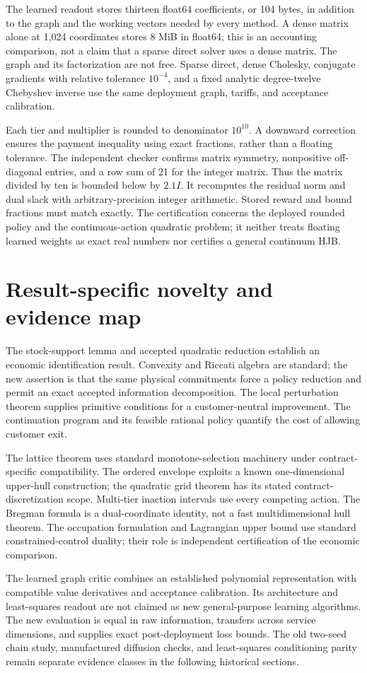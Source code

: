 The learned readout stores thirteen float64 coefficients, or 104 bytes, in addition to the graph and the working vectors needed by every method. A dense matrix alone at 1,024 coordinates stores 8 MiB in float64; this is an accounting comparison, not a claim that a sparse direct solver uses a dense matrix. The graph and its factorization are not free. Sparse direct, dense Cholesky, conjugate gradients with relative tolerance $10^{-4}$, and a fixed analytic degree-twelve Chebyshev inverse use the same deployment graph, tariffs, and acceptance calibration.

Each tier and multiplier is rounded to denominator $10^{10}$. A downward correction ensures the payment inequality using exact fractions, rather than a floating tolerance. The independent checker confirms matrix symmetry, nonpositive off-diagonal entries, and a row sum of 21 for the integer matrix. Thus the matrix divided by ten is bounded below by $2.1I$. It recomputes the residual norm and dual slack with arbitrary-precision integer arithmetic. Stored reward and bound fractions must match exactly. The certification concerns the deployed rounded policy and the continuous-action quadratic problem; it neither treats floating learned weights as exact real numbers nor certifies a general continuum HJB.

\section{Result-specific novelty and evidence map}
The stock-support lemma and accepted quadratic reduction establish an economic identification result. Convexity and Riccati algebra are standard; the new assertion is that the same physical commitments force a policy reduction and permit an exact accepted information decomposition. The local perturbation theorem supplies primitive conditions for a customer-neutral improvement. The continuation program and its feasible rational policy quantify the cost of allowing customer exit.

The lattice theorem uses standard monotone-selection machinery under contract-specific compatibility. The ordered envelope exploits a known one-dimensional upper-hull construction; the quadratic grid theorem has its stated contract-discretization scope. Multi-tier inaction intervals use every competing action. The Bregman formula is a dual-coordinate identity, not a fast multidimensional hull theorem. The occupation formulation and Lagrangian upper bound use standard constrained-control duality; their role is independent certification of the economic comparison.

The learned graph critic combines an established polynomial representation with compatible value derivatives and acceptance calibration. Its architecture and least-squares readout are not claimed as new general-purpose learning algorithms. The new evaluation is equal in raw information, transfers across service dimensions, and supplies exact post-deployment loss bounds. The old two-seed chain study, manufactured diffusion checks, and least-squares conditioning parity remain separate evidence classes in the following historical sections.
